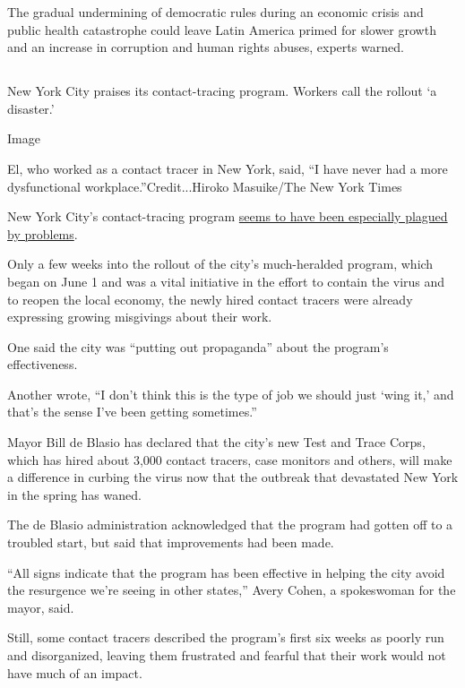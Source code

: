 The gradual undermining of democratic rules during an economic crisis
and public health catastrophe could leave Latin America primed for
slower growth and an increase in corruption and human rights abuses,
experts warned.

\hypertarget{-9}{%
\subsection{}\label{-9}}

New York City praises its contact-tracing program. Workers call the
rollout `a disaster.'

Image

El, who worked as a contact tracer in New York, said, ``I have never had
a more dysfunctional workplace.''Credit...Hiroko Masuike/The New York
Times

New York City's contact-tracing program
\href{https://www.nytimes.com/2020/07/29/nyregion/new-york-contact-tracing.html}{seems
to have been especially plagued by problems}.

Only a few weeks into the rollout of the city's much-heralded program,
which began on June 1 and was a vital initiative in the effort to
contain the virus and to reopen the local economy, the newly hired
contact tracers were already expressing growing misgivings about their
work.

One said the city was ``putting out propaganda'' about the program's
effectiveness.

Another wrote, ``I don't think this is the type of job we should just
`wing it,' and that's the sense I've been getting sometimes.''

Mayor Bill de Blasio has declared that the city's new Test and Trace
Corps, which has hired about 3,000 contact tracers, case monitors and
others, will make a difference in curbing the virus now that the
outbreak that devastated New York in the spring has waned.

The de Blasio administration acknowledged that the program had gotten
off to a troubled start, but said that improvements had been made.

``All signs indicate that the program has been effective in helping the
city avoid the resurgence we're seeing in other states,'' Avery Cohen, a
spokeswoman for the mayor, said.

Still, some contact tracers described the program's first six weeks as
poorly run and disorganized, leaving them frustrated and fearful that
their work would not have much of an impact.

